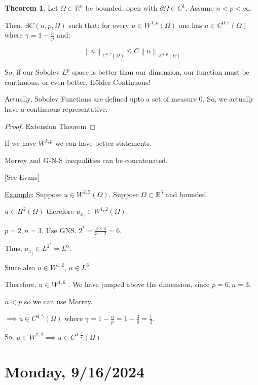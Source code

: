 \documentclass{article}
\theoremstyle{definition}
\newtheorem{theorem}{Theorem}
\begin{document}
\begin{theorem}
    Let \(\Omega \subset \mathbb{R} ^n\) be bounded, open with \(\partial \Omega \in C^1\). Assume \(n < p < \infty\).
    
    Then, \(\exists C (n, p, \Omega)\) such that: for every \(u\in W^{1,p}(\Omega)\) one has \(u\in C^{0,\gamma}(\Omega)\) where \(\gamma = 1- \frac{n}{p}\) and:

    \[
        \left\lVert u \right\rVert _{C^{0, \gamma}(\overline{\Omega})} \leq C \left\lVert u \right\rVert _{W^{1,p}(\Omega)}
    \]

    So, if our Sobolev \(L^p\) space is better than our dimension, our function must be continuous, or even better, H\"older Continuous!

    Actually, Sobolev Functions are defined upto a set of measure \(0\). So, we actually have a continuous representative.
\end{theorem}

\begin{proof}
    Extension Theorem
\end{proof}

If we have \(W^{k,p}\) we can have better statements.

Morrey and G-N-S inequalities can be concatenated.

[See Evans]

\underline{Example}: Suppose \(u\in W^{2,2}(\Omega)\). Suppose \(\Omega \subset \mathbb{R}^3\) and bounded.

\(u\in H^2 (\Omega)\) therefore \(u_{x_j} \in W^{1,2}(\Omega)\). 

\(p=2, n=3\). Use GNS. \(2^{\ast}  = \frac{3\times 2}{3-2} = 6\).

Thus, \(u_{x_j} \in L^{2^{\ast}} = L^6\).

Since also \(u\in W^{1,2}\), \(u\in L^6\). 

Therefore, \(u\in W^{1,6}\) . We have jumped above the dimension, since \(p = 6, n = 3\).

\(n < p\) so we can use Morrey.

\(\implies u\in C^{0,\gamma}(\Omega)\) where \(\gamma = 1-\frac{n}{p} = 1-\frac{3}{6} = \frac{1}{2}\).

So, \(u\in W^{2,2} \implies u \in C^{0,\frac{1}{2}}(\Omega)\). 


\section*{Monday, 9/16/2024}
\end{document}
